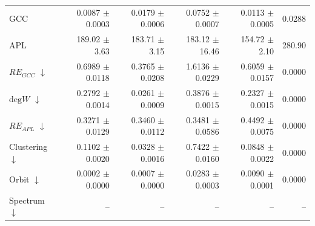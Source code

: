 \begin{table}[H]
\begin{tabular}{lrrrrr}
GCC                           & 0.0087 $\pm$ 0.0003 & 0.0179 $\pm$ 0.0006 & 0.0752 $\pm$ 0.0007 & 0.0113 $\pm$ 0.0005 & 0.0288 \\
APL                           & 189.02 $\pm$ 3.63 & 183.71 $\pm$ 3.15 & 183.12 $\pm$ 16.46 & 154.72 $\pm$ 2.10 & 280.90 \\
\midrule
$RE_{GCC}$ $\downarrow$       & 0.6989 $\pm$ 0.0118 & 0.3765 $\pm$ 0.0208 & 1.6136 $\pm$ 0.0229 & 0.6059 $\pm$ 0.0157 & 0.0000 \\
$\mathrm{deg}W$ $\downarrow$  & 0.2792 $\pm$ 0.0014 & 0.0261 $\pm$ 0.0009 & 0.3876 $\pm$ 0.0015 & 0.2327 $\pm$ 0.0015 & 0.0000 \\
$RE_{APL}$ $\downarrow$       & 0.3271 $\pm$ 0.0129 & 0.3460 $\pm$ 0.0112 & 0.3481 $\pm$ 0.0586 & 0.4492 $\pm$ 0.0075 & 0.0000 \\
Clustering $\downarrow$       & 0.1102 $\pm$ 0.0020 & 0.0328 $\pm$ 0.0016 & 0.7422 $\pm$ 0.0160 & 0.0848 $\pm$ 0.0022 & 0.0000 \\
Orbit $\downarrow$            & 0.0002 $\pm$ 0.0000 & 0.0007 $\pm$ 0.0000 & 0.0283 $\pm$ 0.0003 & 0.0090 $\pm$ 0.0001 & 0.0000 \\
Spectrum $\downarrow$         & -- & -- & -- & -- & -- \\
\bottomrule
\end{tabular}
\end{table}
